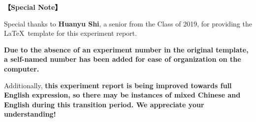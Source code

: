 	
	
\textbf{【Special Note】}	

Special thanks to \textbf{Huanyu Shi}, a senior from the Class of 2019, for providing the \LaTeX \ template for this experiment report. 

\textbf{Due to the absence of an experiment number in the original template, a self-named number has been added for ease of organization on the computer.} 

Additionally, \large\textbf{\textcolor{fred}{this experiment report is being improved towards full English expression, so there may be instances of mixed Chinese and English during this transition period. We appreciate your understanding!}}
	

\clearpage
\tableofcontents		